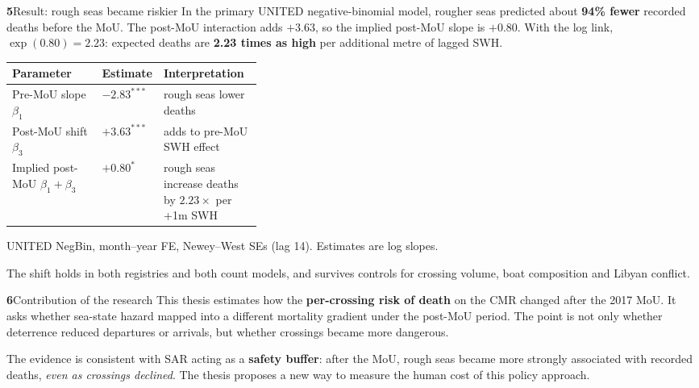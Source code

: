 \documentclass[final]{article}
\newcommand{\col}{0.485\textwidth}
\newcommand{\gp}{\vspace{9mm}}           %
\newcommand{\sechead}[2]{{\color{amber}\bfseries #1}\hspace{3.5mm}#2}
\begin{document}
\begin{minipage}[t]{\col}
  \begin{panel}{\sechead{5}{Result: rough seas became riskier}}
    In the primary UNITED negative-binomial model, rougher seas predicted about
    \textbf{\color{white}94\% fewer} recorded deaths before the MoU. The post-MoU
    interaction adds $+3.63$, so the implied post-MoU slope is $+0.80$. With the log link,
    $\exp(0.80)=2.23$: expected deaths are \textbf{\color{white}2.23 times as high} per
    additional metre of lagged SWH.
    \vspace{2.2mm}
    \begin{tcolorbox}[colback=darkcell, colframe=rule, boxrule=0.8pt, arc=2mm,
                      left=5.5mm, right=5.5mm, top=3.4mm, bottom=3.4mm]
      {\fontsize{20pt}{27pt}\selectfont\color{ink}
       \setlength{\extrarowheight}{1mm}
       \begin{tabularx}{\linewidth}{@{}>{\raggedright\arraybackslash}p{0.36\linewidth} l >{\raggedright\arraybackslash}X@{}}
         Parameter & Estimate & Interpretation\\[1mm]
         \hline
         Pre-MoU slope $\beta_1$            & $-2.83^{***}$                             & rough seas lower deaths\\[1mm]
         Post-MoU shift $\beta_3$           & {\color{amber}$\boldsymbol{+3.63^{***}}$} & adds to pre-MoU SWH effect\\[1mm]
         Implied post-MoU $\beta_1+\beta_3$ & {\color{amberlt}$\boldsymbol{+0.80^{*}}$} & rough seas increase deaths by $2.23\times$ per +1m SWH\\
       \end{tabularx}}\par\vspace{2.2mm}
      {\fontsize{16.5pt}{20.5pt}\selectfont\color{muted}\justifying\setlength{\parindent}{0pt}
       UNITED NegBin, month--year FE, Newey--West SEs (lag 14). Estimates are log slopes.}
    \end{tcolorbox}
    \vspace{2.2mm}
    The shift holds in both registries and both count models, and survives controls for
    crossing volume, boat composition and Libyan conflict.
  \end{panel}
  \gp

\begin{conclbox}{\sechead{6}{Contribution of the research}}
This thesis estimates how the \textbf{per-crossing risk of death} on the
CMR changed after the 2017 MoU. It asks whether sea-state hazard mapped into a different 
mortality gradient under the post-MoU period. The point is not only
whether deterrence reduced departures or arrivals, but whether crossings
became more dangerous.

  \vspace{2mm}

The evidence is consistent with SAR acting as a
\textbf{safety buffer}: after the MoU, rough seas became more strongly
associated with recorded deaths, \emph{even as crossings declined}.
The thesis proposes a new way to measure the human cost of this policy approach.
\end{conclbox}

\end{minipage}
\end{document}
